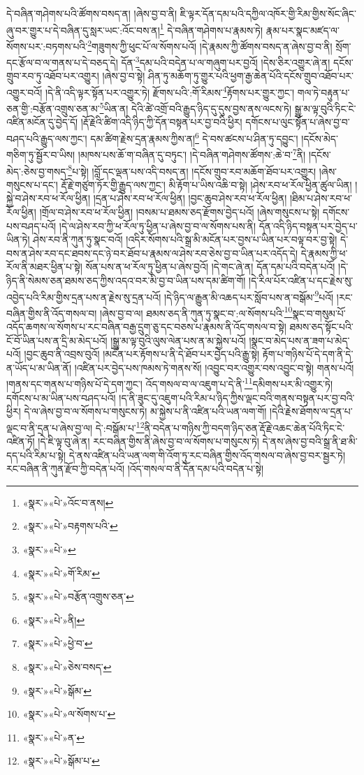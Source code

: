 དེ་བཞིན་གཤེགས་པའི་ཚོགས་བསད་ན། །ཞེས་བྱ་བ་ནི། ཇི་ལྟར་དོན་དམ་པའི་དཀྱིལ་འཁོར་གྱི་རིམ་གྱིས་སོང་ཞིང་ཞུ་བར་གྱུར་པ་དེ་བཞིན་དུ་སླར་ཡང་:འོང་བས་ན།\footnote{«སྣར་»«པེ་»འོང་བ་ནས།} དེ་བཞིན་གཤེགས་པ་རྣམས་ཏེ། རྣམ་པར་སྣང་མཛད་ལ་སོགས་པར་:བཏགས་པའི་\footnote{«སྣར་»«པེ་»བརྟགས་པའི་}གཟུགས་ཀྱི་ཕུང་པོ་ལ་སོགས་པའོ། །དེ་རྣམས་ཀྱི་ཚོགས་བསད་ན་ཞེས་བྱ་བ་ནི། སྲོག་དང་རྩོལ་བ་ལ་གནས་པ་དེ་བཅད་དེ། དོན་\footnote{«སྣར་»«པེ་»}དམ་པའི་བདེན་པ་ལ་གཞུག་པར་བྱའོ། །དེས་ཅིར་འགྱུར་ཞེ་ན། དངོས་གྲུབ་རབ་ཏུ་འཐོབ་པར་འགྱུར། །ཞེས་བྱ་བ་སྟེ། ཤིན་ཏུ་མཆོག་ཏུ་གྱུར་པའི་ཕྱག་རྒྱ་ཆེན་པོའི་དངོས་གྲུབ་འཐོབ་པར་འགྱུར་བའོ། །དེ་ནི་འདི་ལྟར་སྟོན་པར་འགྱུར་ཏེ། རྫོགས་པའི་:གོ་རིམས་\footnote{«སྣར་»«པེ་»གོ་རིམ་}རྟོགས་པར་གྱུར་ཀྱང་། གལ་ཏེ་བརྟུན་པ་ཅན་གྱི་:བརྩོན་འགྲུས་ཅན་མ་\footnote{«སྣར་»«པེ་»བརྩོན་འགྲུས་ཅན་}ཡིན་ན། དེའི་ཚེ་འགྲོ་བའི་རྒྱུད་ཉིད་དུ་དུས་བྱས་ནས་ལངས་ཏེ། སྒྱུ་མ་ལྟ་བུའི་ཏིང་ངེ་འཛིན་མངོན་དུ་བྱེད་དོ། །རྡོ་རྗེའི་ཚིག་འདི་ཉིད་ཀྱི་དོན་བསྟན་པར་བྱ་བའི་ཕྱིར། དགོངས་པ་ལུང་སྟོན་པ་ཞེས་བྱ་བ་བཤད་པའི་རྒྱུད་ལས་ཀྱང་། དམ་ཚིག་རྗེས་དྲན་རྣམས་ཀྱིས་ན།\footnote{«སྣར་»«པེ་»ནི།} དེ་བས་ཚངས་པ་ཤིན་ཏུ་དབྱུང་། །དངོས་མེད་གཅིག་ཏུ་སྦྱོར་བ་ཡིས། །མཁས་པས་ཆོ་ག་བཞིན་དུ་བཏུང་། །དེ་བཞིན་གཤེགས་ཚོགས་:ཆེ་བ་\footnote{«སྣར་»«པེ་»ཕྱེ་བ་}ནི། །དངོས་མེད་:ཅེས་བྱ་གསད་\footnote{«སྣར་»«པེ་»ཅེས་བསད་}པ་སྟེ། །བློ་དང་ལྡན་པས་འདི་བསད་ན། །དངོས་གྲུབ་རབ་མཆོག་ཐོབ་པར་འགྱུར། །ཞེས་གསུངས་པ་དང་། རྡོ་རྗེ་གཙུག་ཏོར་གྱི་རྒྱུད་ལས་ཀྱང་། མི་རྟོག་པ་ཡིས་འཆི་བ་སྟེ། །ཤེས་རབ་ཕ་རོལ་ཕྱིན་ཚུལ་ཡིན། །སྐྱེ་བ་ཤེས་རབ་ཕ་རོལ་ཕྱིན། །དྲན་པ་ཤེས་རབ་ཕ་རོལ་ཕྱིན། །བྱང་ཆུབ་ཤེས་རབ་ཕ་རོལ་ཕྱིན། །ཐིམ་པ་ཤེས་རབ་ཕ་རོལ་ཕྱིན། །གྲོལ་བ་ཤེས་རབ་ཕ་རོལ་ཕྱིན། །བསམ་པ་ཐམས་ཅད་རྫོགས་བྱེད་པའོ། །ཞེས་གསུངས་པ་སྟེ། དགོངས་པས་བཤད་པའོ། །དེ་ལ་ཤེས་རབ་ཀྱི་ཕ་རོལ་ཏུ་ཕྱིན་པ་ཞེས་བྱ་བ་ལ་སོགས་པས་ནི། དོན་འདི་ཉིད་བསྟན་པར་བྱེད་པ་ཡིན་ཏེ། ཤེས་རབ་ནི་ཀུན་ཏུ་སྣང་བའོ། །འདིར་སོགས་པའི་སྒྲ་མི་མངོན་པར་བྱས་པ་ཡིན་པར་བལྟ་བར་བྱ་སྟེ། དེ་བས་ན་ཤེས་རབ་དང་ཐབས་དང་ཉེ་བར་ཐོབ་པ་རྣམས་ལ་ཤེས་རབ་ཅེས་བྱ་བ་ཡིན་པར་འདོད་དེ། དེ་རྣམས་ཀྱི་ཕ་རོལ་ནི་མཐར་ཕྱིན་པ་སྟེ། སོན་པས་ན་ཕ་རོལ་ཏུ་ཕྱིན་པ་ཞེས་བྱའོ། །དེ་གང་ཞེ་ན། དོན་དམ་པའི་བདེན་པའོ། །དེ་ཉིད་ནི་སེམས་ཅན་ཐམས་ཅད་ཀྱིས་འདའ་བར་མི་བྱ་བ་ཡིན་པས་དམ་ཚིག་གོ། །དེ་རིལ་པོར་འཛིན་པ་དང་རྗེས་སུ་འབྱེད་པའི་རིམ་གྱིས་དྲན་པས་ན་རྗེས་སུ་དྲན་པའོ། །དེ་ཉིད་ལ་རྒྱུན་མི་འཆད་པར་སློབ་པས་ན་བསྒོམ་\footnote{«སྣར་»«པེ་»སྒོམ་}པའོ། །རང་བཞིན་གྱིས་ནི་འོད་གསལ་བ། །ཞེས་བྱ་བ་ལ། ཐམས་ཅད་ནི་ཀུན་ཏུ་སྣང་བ་:ལ་སོགས་པའི་\footnote{«སྣར་»«པེ་»ལ་སོགས་པ་}སྣང་བ་གསུམ་པོ་འདོད་ཆགས་ལ་སོགས་པ་རང་བཞིན་བརྒྱ་དྲུག་ཅུ་དང་བཅས་པ་རྣམས་ནི་འོད་གསལ་བ་སྟེ། ཐམས་ཅད་སྟོང་པའི་ངོ་བོ་ཡིན་པས་ན་དྲི་མ་མེད་པའོ། །སྒྱུ་མ་ལྟ་བུའི་ལུས་ལེན་པས་ན་མ་སྐྱེས་པའོ། །སྣང་བ་མེད་པས་ན་ཟག་པ་མེད་པའོ། །བྱང་ཆུབ་ནི་འབྲས་བུའོ། །མངོན་པར་རྟོགས་པ་ནི་དེ་ཐོབ་པར་བྱེད་པའི་རྒྱུ་སྟེ། རྟོག་པ་གཉིས་པོ་དེ་དག་ནི་དེ་ན་ཡོད་པ་མ་ཡིན་ནོ། །འཛིན་པར་བྱེད་པས་ཁམས་ཏེ་གནས་སོ། །འབྱུང་བར་འགྱུར་བས་འབྱུང་བ་སྟེ། གནས་པའོ། །གནས་དང་གནས་པ་གཉིས་པོ་དེ་དག་ཀྱང་། འོད་གསལ་བ་ལ་འཇུག་པ་དེ་ནི་\footnote{«སྣར་»«པེ་»ན་}དམིགས་པར་མི་འགྱུར་ཏེ། དགོངས་པ་མ་ཡིན་པས་བཤད་པའོ། །ད་ནི་ཟུང་དུ་འཇུག་པའི་རིམ་པ་ཉིད་ཀྱིས་ལྡང་བའི་གནས་བསྟན་པར་བྱ་བའི་ཕྱིར། དེ་ལ་ཞེས་བྱ་བ་ལ་སོགས་པ་གསུངས་ཏེ། མ་སྐྱེས་པ་ནི་འཛིན་པའི་ཡན་ལག་གོ། །དེའི་རྗེས་ཐོགས་ལ་དྲན་པ་ལྡང་བ་ནི་དྲན་པ་ཞེས་བྱ་ལ། དེ་:བསྒོམ་པ་\footnote{«སྣར་»«པེ་»སྒོམ་པ་}ནི་བདེན་པ་གཉིས་ཀྱི་བདག་ཉིད་ཅན་རྡོ་རྗེ་འཆང་ཆེན་པོའི་ཏིང་ངེ་འཛིན་ཏོ། །དེ་ཇི་ལྟ་བུ་ཞེ་ན། རང་བཞིན་གྱིས་ནི་ཞེས་བྱ་བ་ལ་སོགས་པ་གསུངས་ཏེ། དེ་ནས་ཞེས་བྱ་བའི་སྒྲ་ནི་ཐ་མི་དད་པའི་རིམ་པ་སྟེ། དེ་ནས་འཛིན་པའི་ཡན་ལག་གི་འོག་ཏུ་རང་བཞིན་གྱིས་འོད་གསལ་བ་ཞེས་བྱ་བར་སྦྱར་ཏེ། རང་བཞིན་ནི་ཀུན་རྫོབ་ཀྱི་བདེན་པའོ། །འོད་གསལ་བ་ནི་དོན་དམ་པའི་བདེན་པ་སྟེ། 